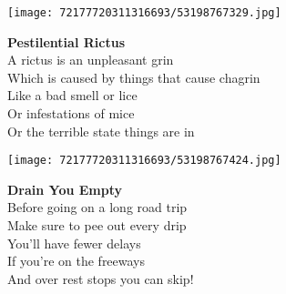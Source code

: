 \documentclass[10pt,letterpaper]{article}
\begin{document}
\begin{center}
\texttt{[image: 72177720311316693/53198767329.jpg]}
\end{center}

\begin{center}
\textbf{Pestilential Rictus}\\
\vskip 0.2in
A rictus is an unpleasant grin\\
Which is caused by things that cause chagrin\\
Like a bad smell or lice\\
Or infestations of mice\\
Or the terrible state things are in\\
\end{center}
\pagebreak

\begin{center}
\texttt{[image: 72177720311316693/53198767424.jpg]}
\end{center}

\begin{center}
\textbf{Drain You Empty}\\
\vskip 0.2in
Before going on a long road trip\\
Make sure to pee out every drip\\
You'll have fewer delays\\
If you're on the freeways\\
And over rest stops you can skip!\\
\end{center}
\pagebreak
\end{document}
